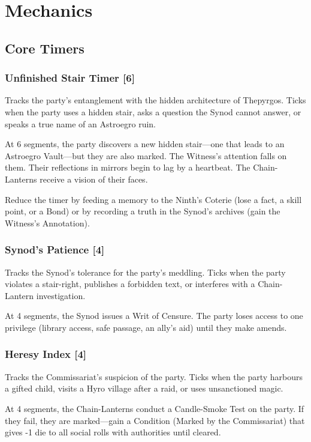 \documentclass[10pt,twocolumn]{book}
\begin{document}
\chapter{Mechanics}

\section{Core Timers}

\subsection{Unfinished Stair Timer [6]}

Tracks the party's entanglement with the hidden architecture of Thepyrgos. Ticks when the party uses a hidden stair, asks a question the Synod cannot answer, or speaks a true name of an Astroegro ruin.

At 6 segments, the party discovers a new hidden stair---one that leads to an Astroegro Vault---but they are also marked. The Witness's attention falls on them. Their reflections in mirrors begin to lag by a heartbeat. The Chain-Lanterns receive a vision of their faces.

Reduce the timer by feeding a memory to the Ninth's Coterie (lose a fact, a skill point, or a Bond) or by recording a truth in the Synod's archives (gain the Witness's Annotation).

\subsection{Synod's Patience [4]}

Tracks the Synod's tolerance for the party's meddling. Ticks when the party violates a stair-right, publishes a forbidden text, or interferes with a Chain-Lantern investigation.

At 4 segments, the Synod issues a Writ of Censure. The party loses access to one privilege (library access, safe passage, an ally's aid) until they make amends.

\subsection{Heresy Index [4]}

Tracks the Commissariat's suspicion of the party. Ticks when the party harbours a gifted child, visits a Hyro village after a raid, or uses unsanctioned magic.

At 4 segments, the Chain-Lanterns conduct a Candle-Smoke Test on the party. If they fail, they are marked---gain a Condition (Marked by the Commissariat) that gives -1 die to all social rolls with authorities until cleared.
\end{document}
